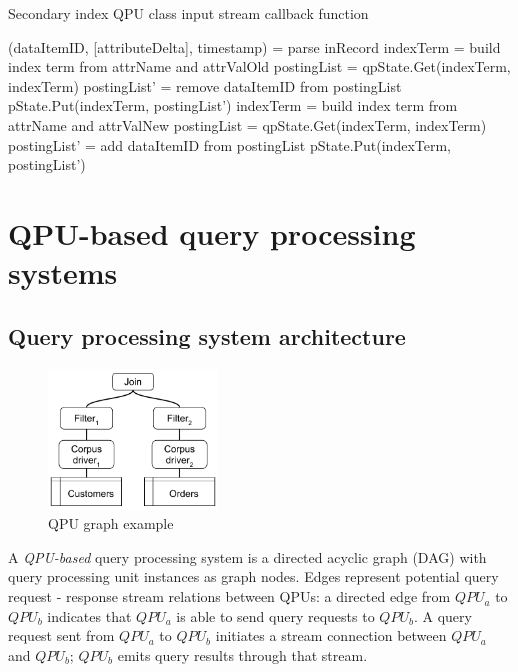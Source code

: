 \begin{algorithm}
\caption{Secondary index QPU class input stream callback function}
\label{algo:index_callback_func}
\begin{algorithmic}
\State (dataItemID, [attributeDelta], timestamp) = parse inRecord
\State indexTerm = build index term from attrName and attrValOld
\State postingList = qpState.Get(indexTerm, indexTerm)
\State postingList' = remove dataItemID from postingList
\State pState.Put(indexTerm, postingList')
\EndIf
{}
\State indexTerm = build index term from attrName and attrValNew
\State postingList = qpState.Get(indexTerm, indexTerm)
\State postingList' = add dataItemID from postingList
\State pState.Put(indexTerm, postingList')
\EndIf
\EndFor
\EndFunction
\end{algorithmic}
\end{algorithm}


\section{QPU-based query processing systems}
\label{sec:query_processing_system}

\subsection{Query processing system architecture}

\begin{figure}[t]
  \centering
    \includegraphics[width=0.4\textwidth]{./figures/design_pattern/qpu_graph_emergent_properties.pdf}
  \caption{QPU graph example}
  \label{fig:qpu_graph_emergent_properties}
\end{figure}

A \textit{QPU-based} query processing system is a directed acyclic graph (DAG) with query processing unit instances as
graph nodes.
Edges represent potential query request - response stream relations between QPUs:
a directed edge from $QPU_a$ to $QPU_b$ indicates that $QPU_a$ is able to send query requests to $QPU_b$.
A query request sent from $QPU_a$ to $QPU_b$ initiates a stream connection between $QPU_a$ and $QPU_b$;
$QPU_b$ emits query results through that stream.

